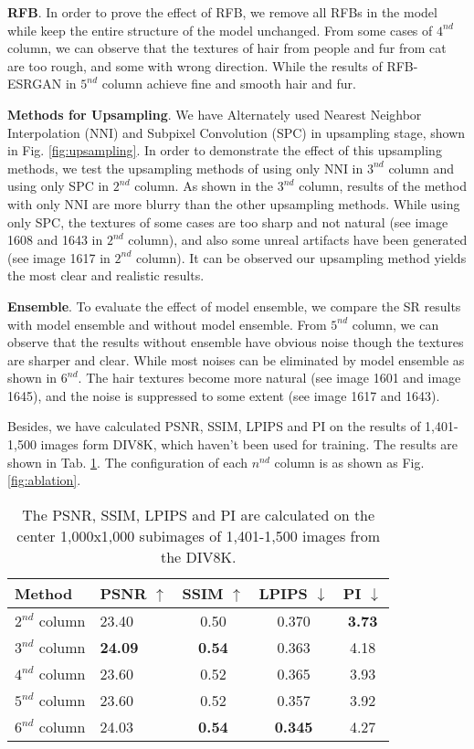 \documentclass[10pt,twocolumn,letterpaper]{article}
\begin{document}
\textbf{RFB}. In order to prove the effect of RFB, we remove all RFBs in the model while keep the entire structure of the model unchanged. From some cases of $4^{nd}$ column, we can observe that the textures of hair from people and fur from cat are too rough, and some with wrong direction. While the results of RFB-ESRGAN in $5^{nd}$ column achieve fine and smooth hair and fur. 

\textbf{Methods for Upsampling}. We have Alternately used Nearest Neighbor Interpolation (NNI) and Subpixel Convolution (SPC) in upsampling stage, shown in Fig. \ref{fig:upsampling}. In order to demonstrate the effect of this upsampling methods, we test the upsampling methods of using only NNI in $3^{nd}$ column and using only SPC in $2^{nd}$ column. As shown in the $3^{nd}$ column, results of the method with only NNI are more blurry than the other upsampling methods. While using only SPC, the textures of some cases are too sharp and not natural (see image 1608 and 1643 in $2^{nd}$ column), and also some unreal artifacts have been generated (see image 1617 in $2^{nd}$ column). It can be observed our upsampling method yields the most clear and realistic results. 

\textbf{Ensemble}. To evaluate the effect of model ensemble, we compare the SR results with model ensemble and without model ensemble. From $5^{nd}$ column, we can observe that the results without ensemble have obvious noise though the textures are sharper and clear. While  most noises can be eliminated by model ensemble as shown in $6^{nd}$. The hair textures become more natural (see image 1601 and image 1645), and the noise is suppressed to some extent (see image 1617 and 1643).

Besides, we have calculated PSNR, SSIM, LPIPS and PI on the results of 1,401-1,500 images form DIV8K, which haven't been used for training. The results are shown in Tab. \ref{tab:validation2}. The configuration of each $n^{nd}$ column is as shown as Fig. \ref{fig:ablation}.

\begin{table}[htbp]
\centering
\begin{tabular}{llccc}
\hline \hline
\multicolumn{1}{l|}{Method}          & PSNR $\uparrow$   & SSIM $\uparrow$    & LPIPS $\downarrow$  & PI $\downarrow$   \\ \hline

\multicolumn{1}{l|}{$2^{nd}$ column} & 23.40  & 0.50  & 0.370  & \textbf{3.73} \\
\multicolumn{1}{l|}{$3^{nd}$ column} & \textbf{24.09}  & \textbf{0.54}  & 0.363  & 4.18 \\
\multicolumn{1}{l|}{$4^{nd}$ column} & 23.60  & 0.52  & 0.365  & 3.93 \\
\multicolumn{1}{l|}{$5^{nd}$ column} & 23.60  & 0.52  & 0.357  & 3.92      \\
\multicolumn{1}{l|}{$6^{nd}$ column} & 24.03  & \textbf{0.54}  & \textbf{0.345}  & 4.27      \\
\hline\hline
\end{tabular}
\caption{The PSNR, SSIM, LPIPS and PI are calculated on the center 1,000x1,000 subimages of 1,401-1,500 images from the DIV8K.}
\label{tab:validation2}
\end{table}
\end{document}
